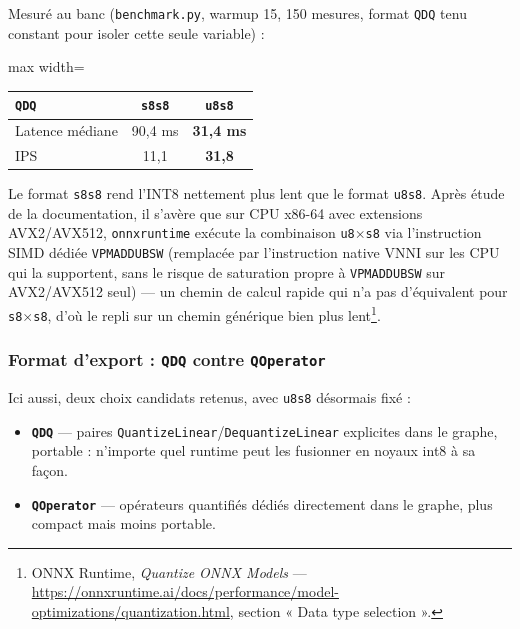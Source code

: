 \documentclass[11pt,a4paper]{article}
\let\Oldsubsubsection\subsubsection
\renewcommand{\subsubsection}{\FloatBarrier\Oldsubsubsection}
\begin{document}
    Mesuré au banc (\texttt{benchmark.py}, warmup 15, 150 mesures, format
    \texttt{QDQ} tenu constant pour isoler cette seule variable) :
    
    \begin{table}[!htbp]
    \centering
    \small
    \begin{adjustbox}{max width=\linewidth}
    \begin{tabular}{@{}lcc@{}}
    \toprule
    \texttt{QDQ} & \texttt{s8s8} & \texttt{u8s8} \\
    \midrule
    Latence médiane & 90,4 ms & \textbf{31,4 ms} \\
    IPS & 11,1 & \textbf{31,8} \\
    \bottomrule
    \end{tabular}
    \end{adjustbox}
    \end{table}
    
    Le format \texttt{s8s8} rend l'INT8 nettement plus lent que le format
    \texttt{u8s8}. Après étude de la documentation, il s'avère que sur CPU
    x86-64 avec extensions AVX2/AVX512, \texttt{onnxruntime} exécute la
    combinaison
    \texttt{u8}$\times$\texttt{s8} via l'instruction SIMD dédiée
    \texttt{VPMADDUBSW} (remplacée par l'instruction native VNNI sur les
    CPU qui la supportent, sans le risque de saturation propre à
    \texttt{VPMADDUBSW} sur AVX2/AVX512 seul) --- un chemin de calcul
    rapide qui n'a pas d'équivalent pour \texttt{s8}$\times$\texttt{s8},
    d'où le repli sur un chemin générique bien plus lent\footnote{ONNX
    Runtime, \emph{Quantize ONNX Models} ---
    \url{https://onnxruntime.ai/docs/performance/model-optimizations/quantization.html},
    section « Data type selection ».}.
    
    \subsubsection{Format d'export : \texttt{QDQ} contre \texttt{QOperator}}
    
    Ici aussi, deux choix candidats retenus, avec \texttt{u8s8} désormais
    fixé :
    
    \begin{itemize}[leftmargin=1.5em]
      \item \textbf{\texttt{QDQ}} --- paires \texttt{QuantizeLinear}/\texttt{DequantizeLinear}
        explicites dans le graphe, portable : n'importe quel runtime peut
        les fusionner en noyaux int8 à sa façon.
      \item \textbf{\texttt{QOperator}} --- opérateurs quantifiés dédiés
        directement dans le graphe, plus compact mais moins portable.
    \end{itemize}
    
\end{document}
